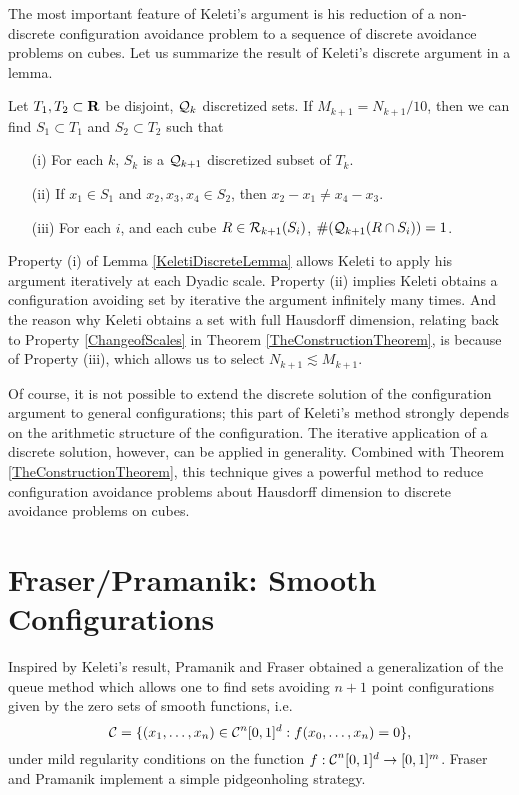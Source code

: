 The most important feature of Keleti's argument is his reduction of a non-discrete configuration avoidance problem to a sequence of discrete avoidance problems on cubes. Let us summarize the result of Keleti's discrete argument in a lemma.

\begin{lemma} \label{KeletiDiscreteLemma}
    Let $T_1, T_2 \subset \operatorname{\mathbf{R}}$ be disjoint, $\operatorname{\mathcal{Q}}_k$ discretized sets. If $M_{k+1} = N_{k+1}/10$, then we can find $S_1 \subset T_1$ and $S_2 \subset T_2$ such that
    \begin{enumerate}
        \item[(i)] For each $k$, $S_k$ is a $\operatorname{\mathcal{Q}}_{k+1}$ discretized subset of $T_k$.
        \item[(ii)] If $x_1 \in S_1$ and $x_2,x_3,x_4 \in S_2$, then $x_2 - x_1 \neq x_4 - x_3$.
        \item[(iii)] For each $i$, and each cube $R \in \operatorname{\mathcal{R}}_{k+1}(S_i)$, $\#(\operatorname{\mathcal{Q}}_{k+1}(R \cap S_i)) = 1$.
    \end{enumerate}
\end{lemma}
%
Property (i) of Lemma \ref{KeletiDiscreteLemma} allows Keleti to apply his argument iteratively at each Dyadic scale. Property (ii) implies Keleti obtains a configuration avoiding set by iterative the argument infinitely many times. And the reason why Keleti obtains a set with full Hausdorff dimension, relating back to Property \ref{ChangeofScales} in Theorem \ref{TheConstructionTheorem}, is because of Property (iii), which allows us to select $N_{k+1} \lesssim M_{k+1}$.

Of course, it is not possible to extend the discrete solution of the configuration argument to general configurations; this part of Keleti's method strongly depends on the arithmetic structure of the configuration. The iterative application of a discrete solution, however, can be applied in generality. Combined with Theorem \ref{TheConstructionTheorem}, this technique gives a powerful method to reduce configuration avoidance problems about Hausdorff dimension to discrete avoidance problems on cubes.







\section{Fraser/Pramanik: Smooth Configurations}

Inspired by Keleti's result, Pramanik and Fraser obtained a generalization of the queue method which allows one to find sets avoiding $n+1$ point configurations given by the zero sets of smooth functions, i.e.
%
\[ \operatorname{\mathcal{C}} = \{ (x_1, \dots, x_n) \in \operatorname{\mathcal{C}}^n[0,1]^d : f(x_0, \dots, x_n) = 0 \}, \]
%
under mild regularity conditions on the function $f: \operatorname{\mathcal{C}}^n[0,1]^d \to [0,1]^m$. Fraser and Pramanik implement a simple pidgeonholing strategy.

